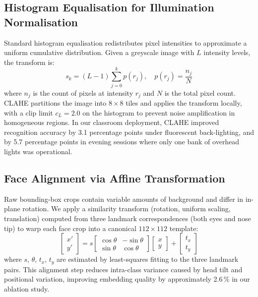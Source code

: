 \documentclass[conference, 10pt]{IEEEtran}
\begin{document}
\subsection{Histogram Equalisation for Illumination Normalisation}

Standard histogram equalisation redistributes pixel intensities to approximate a uniform
cumulative distribution.  Given a greyscale image with $L$ intensity levels, the transform is:
\begin{equation}
\label{eq:histeq}
    s_k = (L - 1) \sum_{j=0}^{k} p(r_j), \quad p(r_j) = \frac{n_j}{N}
\end{equation}
where $n_j$ is the count of pixels at intensity $r_j$ and $N$ is the total pixel count.
CLAHE partitions the image into $8 \times 8$ tiles and applies the transform locally, with a
clip limit $c_L = 2.0$ on the histogram to prevent noise amplification in homogeneous regions.
In our classroom deployment, CLAHE improved recognition accuracy by 3.1 percentage points under
fluorescent back-lighting, and by 5.7 percentage points in evening sessions where only one bank
of overhead lights was operational.

\subsection{Face Alignment via Affine Transformation}

Raw bounding-box crops contain variable amounts of background and differ in in-plane rotation.
We apply a similarity transform (rotation, uniform scaling, translation) computed from three
landmark correspondences (both eyes and nose tip) to warp each face crop into a canonical
$112 \times 112$ template:
\begin{equation}
\label{eq:affine}
    \begin{bmatrix} x' \\ y' \end{bmatrix}
    = s \begin{bmatrix} \cos\theta & -\sin\theta \\ \sin\theta & \cos\theta \end{bmatrix}
      \begin{bmatrix} x \\ y \end{bmatrix}
    + \begin{bmatrix} t_x \\ t_y \end{bmatrix}
\end{equation}
where $s$, $\theta$, $t_x$, $t_y$ are estimated by least-squares fitting to the three
landmark pairs.  This alignment step reduces intra-class variance caused by head tilt and
positional variation, improving embedding quality by approximately 2.6\,\% in our ablation
study.
\end{document}
